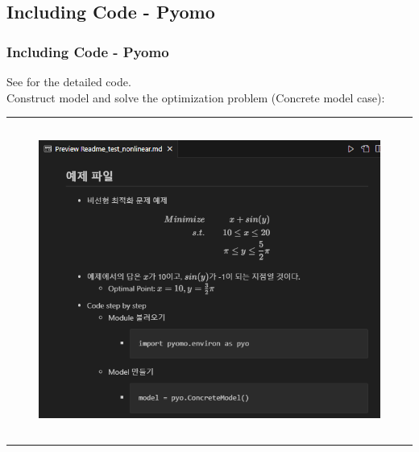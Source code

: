 \documentclass[
	11pt, %
	aspectratio=169, %
]{beamer}
\begin{document}

\subsection{Including Code - Pyomo}
\begin{frame}
	\frametitle{Including Code - Pyomo}
	
	See \href{https://github.com/kwoong2001/pyomoatoz/blob/main/Basic/Nonliear_problem/test_nonlinear.py}{} for the detailed code.\\
	
	Construct model and solve the optimization problem (Concrete model case):
	\rule{\textwidth}{1pt}
	
	\begin{columns}
		\begin{column}{0.5\textwidth}
			\begin{figure}
				\includegraphics[width=2 in,keepaspectratio]{pyomo_example.png}
			\end{figure}
		\end{column}
	\end{columns}

	\rule{\textwidth}{1pt}

\end{frame}
	
\end{document}
